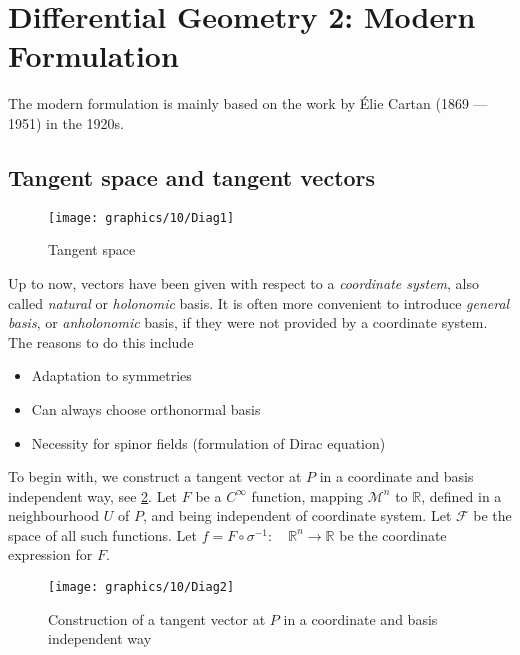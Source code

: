\section{Differential Geometry 2: Modern Formulation}
\label{sec:diff-geo-2}
The modern formulation is mainly based on the work by Élie Cartan
(1869 --- 1951) in the 1920s.

\subsection{Tangent space and tangent vectors}
\begin{figure}
\centering
\texttt{[image: graphics/10/Diag1]}
\caption{Tangent space\label{fig:tangent-space}}
\end{figure}
Up to now, vectors have been given with respect to a \emph{coordinate system},
also called \emph{natural} or \emph{holonomic} basis. It is often more
convenient to introduce \emph{general basis}, or \emph{anholonomic} basis, if
they were not provided by a coordinate system. The reasons to do this include
\begin{itemize}
\item	Adaptation to symmetries
\item	Can always choose orthonormal basis
\item	Necessity for spinor fields (formulation of Dirac equation)
\end{itemize}

To begin with, we construct a tangent vector at $P$ in a coordinate and basis
independent way, see \cref{fig:construct-t-vec}.
Let $F$ be a $C^\infty$ function, mapping $\mathcal{M}^n$ to
$\mathbb{R}$, defined in a neighbourhood $U$ of $P$, and being independent of
coordinate system. Let $\mathcal{F}$ be the space of all such functions. Let
$f = F\circ \sigma^{-1} :\quad \mathbb{R}^n \to \mathbb{R}$ be the coordinate
expression for $F$.

\begin{figure}
\centering
\texttt{[image: graphics/10/Diag2]}
\caption{Construction of a tangent vector at $P$ in a coordinate and basis
independent way\label{fig:construct-t-vec}}
\end{figure}

